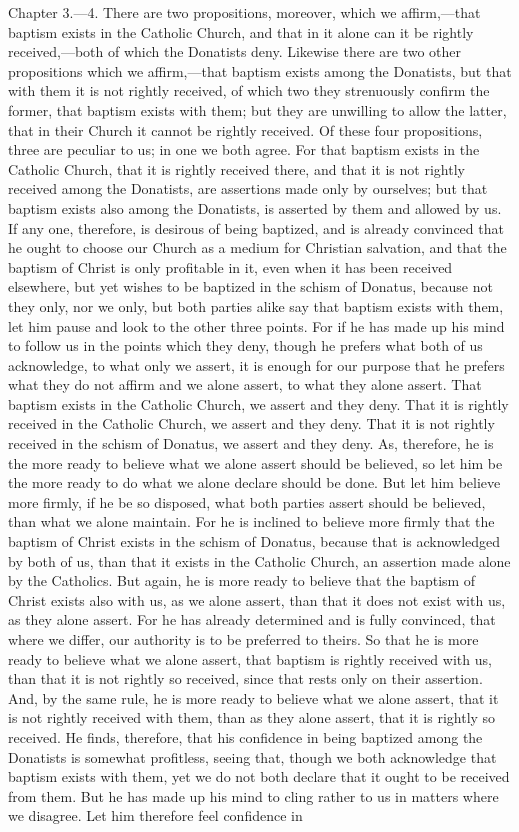 Chapter 3.—4. There are two propositions, moreover, which we affirm,—that baptism exists in the Catholic Church, and that in it alone can it be rightly received,—both of which the Donatists deny. Likewise there are two other propositions which we affirm,—that baptism exists among the Donatists, but that with them it is not rightly received, of which two they strenuously confirm the former, that baptism exists with them; but they are unwilling to allow the latter, that in their Church it cannot be rightly received. Of these four propositions, three are peculiar to us; in one we both agree. For that baptism exists in the Catholic Church, that it is rightly received there, and that it is not rightly received among the Donatists, are assertions made only by ourselves; but that baptism exists also among the Donatists, is asserted by them and allowed by us. If any one, therefore, is desirous of being baptized, and is already convinced that he ought to choose our Church as a medium for Christian salvation, and that the baptism of Christ is only profitable in it, even when it has been received elsewhere, but yet wishes to be baptized in the schism of Donatus, because not they only, nor we only, but both parties alike say that baptism exists with them, let him pause and look to the other three points. For if he has made up his mind to follow us in the points which they deny, though he prefers what both of us acknowledge, to what only we assert, it is enough for our purpose that he prefers what they do not affirm and we alone assert, to what they alone assert. That baptism exists in the Catholic Church, we assert and they deny. That it is rightly received in the Catholic Church, we assert and they deny. That it is not rightly received in the schism of Donatus, we assert and they deny. As, therefore, he is the more ready to believe what we alone assert should be believed, so let him be the more ready to do what we alone declare should be done. But let him believe more firmly, if he be so disposed, what both parties assert should be believed, than what we alone maintain. For he is inclined to believe more firmly that the baptism of Christ exists in the schism of Donatus, because that is acknowledged by both of us, than that it exists in the Catholic Church, an assertion made alone by the Catholics. But again, he is more ready to believe that the baptism of Christ exists also with us, as we alone assert, than that it does not exist with us, as they alone assert. For he has already determined and is fully convinced, that where we differ, our authority is to be preferred to theirs. So that he is more ready to believe what we alone assert, that baptism is rightly received with us, than that it is not rightly so received, since that rests only on their assertion. And, by the same rule, he is more ready to believe what we alone assert, that it is not rightly received with them, than as they alone assert, that it is rightly so received. He finds, therefore, that his confidence in being baptized among the Donatists is somewhat profitless, seeing that, though we both acknowledge that baptism exists with them, yet we do not both declare that it ought to be received from them. But he has made up his mind to cling rather to us in matters where we disagree. Let him therefore feel confidence in 
